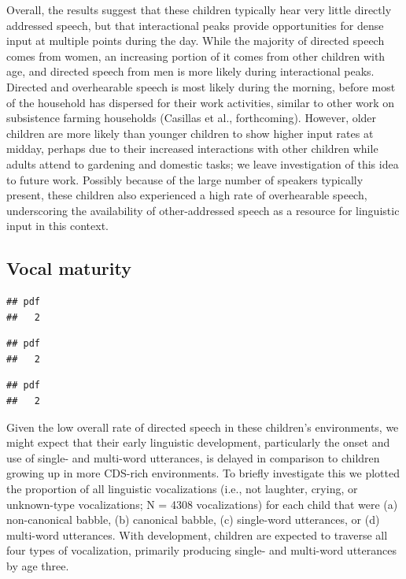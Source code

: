 \documentclass[,man,floatsintext]{apa6}
\begin{document}
Overall, the results suggest that these children typically hear very
little directly addressed speech, but that interactional peaks provide
opportunities for dense input at multiple points during the day. While
the majority of directed speech comes from women, an increasing portion
of it comes from other children with age, and directed speech from men
is more likely during interactional peaks. Directed and overhearable
speech is most likely during the morning, before most of the household
has dispersed for their work activities, similar to other work on
subsistence farming households (Casillas et al., forthcoming). However,
older children are more likely than younger children to show higher
input rates at midday, perhaps due to their increased interactions with
other children while adults attend to gardening and domestic tasks; we
leave investigation of this idea to future work. Possibly because of the
large number of speakers typically present, these children also
experienced a high rate of overhearable speech, underscoring the
availability of other-addressed speech as a resource for linguistic
input in this context.

\subsection{Vocal maturity}\label{vocal-maturity}

\begin{verbatim}
## pdf 
##   2
\end{verbatim}

\begin{verbatim}
## pdf 
##   2
\end{verbatim}

\begin{verbatim}
## pdf 
##   2
\end{verbatim}

Given the low overall rate of directed speech in these children's
environments, we might expect that their early linguistic development,
particularly the onset and use of single- and multi-word utterances, is
delayed in comparison to children growing up in more CDS-rich
environments. To briefly investigate this we plotted the proportion of
all linguistic vocalizations (i.e., not laughter, crying, or
unknown-type vocalizations; N = 4308 vocalizations) for each child that
were (a) non-canonical babble, (b) canonical babble, (c) single-word
utterances, or (d) multi-word utterances. With development, children are
expected to traverse all four types of vocalization, primarily producing
single- and multi-word utterances by age three.
\end{document}
